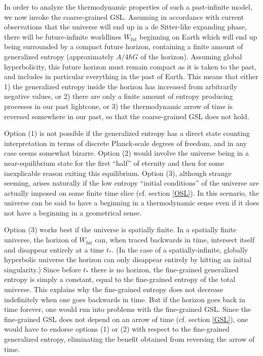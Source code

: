 \documentclass{article}
\begin{document}
In order to analyze the thermodynamic properties of such a past-infinite model, we now invoke the coarse-grained GSL.  Assuming in accordance with current observations that the universe will end up in a de Sitter-like expanding phase, there will be future-infinite worldlines $W_\mathrm{fut}$ beginning on Earth which will end up being surrounded by a compact future horizon, containing a finite amount of generalized entropy (approximately $A/4\hbar G$ of the horizon).  Assuming global hyperbolicity, this future horizon must remain compact as it is taken to the past, and includes in particular everything in the past of Earth.  This means that either 1) the generalized entropy inside the horizon has increased from arbitrarily negative values, or 2) there are only a finite amount of entropy producing processes in our past lightcone, or 3) the thermodynamic arrow of time is reversed somewhere in our past, so that the coarse-grained GSL does not hold.

Option (1) is not possible if the generalized entropy has a direct state counting interpretation in terms of discrete 
Planck-scale degrees of freedom, and in any case seems somewhat bizarre.  Option (2) would involve the universe being in a near-equilibrium state for the first ``half'' of eternity and then for some inexplicable reason exiting this equilibrium.  Option (3), although strange seeming, arises naturally if the low entropy ``initial conditions'' of the universe are actually imposed on some finite time slice (cf. section \ref{OSL}).  In this scenario, the universe can be said to have a beginning in a thermodynamic sense even if it does not have a beginning in a geometrical sense.

Option (3) works best if the universe is spatially finite.  In a spatially finite universe, the horizon of $W_\mathrm{fut}$ can, when traced backwards in time, intersect itself and disappear entirely at a time $t_*$.  (In the case of a spatially-infinite, globally hyperbolic universe the horizon can only disappear entirely by hitting an initial singularity.)  Since before $t_*$ there is no horizon, the fine-grained generalized entropy is simply a constant, equal to the fine-grained entropy of the total universe.  This explains why the fine-grained entropy does not decrease indefinitely when one goes backwards in time.  But if the horizon goes back in time forever, one would run into problems with the fine-grained GSL.  Since the fine-grained GSL does not depend on an arrow of time (cf. section \ref{GSL}), one would have to endorse options (1) or (2) with respect to the fine-grained generalized entropy, eliminating the benefit obtained from reversing the arrow of time.
\end{document}
